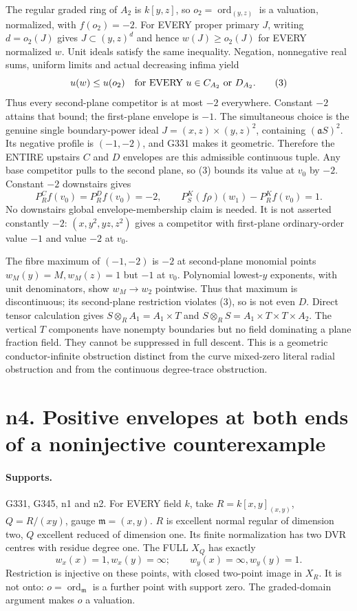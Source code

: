 \documentclass[11pt]{article}
\begin{document}
The regular graded ring of $A_2$ is $k[y,z]$, so $o_2=\operatorname{ord}_{(y,z)}$ is a valuation, normalized, with $f(o_2)=-2$. For EVERY proper primary $J$, writing $d=o_2(J)$ gives $J\subset(y,z)^d$ and hence $w(J)\ge o_2(J)$ for EVERY normalized $w$. Unit ideals satisfy the same inequality. Negation, nonnegative real sums, uniform limits and actual decreasing infima yield
\[
 u(w)\le u(o_2)\quad\hbox{for EVERY }u\in C_{A_2}\text{ or }D_{A_2}. \tag{3}
\]
Thus every second-plane competitor is at most $-2$ everywhere. Constant $-2$ attains that bound; the first-plane envelope is $-1$. The simultaneous choice is the genuine single boundary-power ideal
$J=(x,z)\times(y,z)^2$, containing $(\mathfrak aS)^2$. Its negative profile is $(-1,-2)$, and G331 makes it geometric. Therefore the ENTIRE upstairs $C$ and $D$ envelopes are this admissible continuous tuple. Any base competitor pulls to the second plane, so (3) bounds its value at $v_0$ by $-2$. Constant $-2$ downstairs gives
\[
 P_R^Cf(v_0)=P_R^Df(v_0)=-2,\qquad
 P_S^K(f\rho)(w_1)-P_R^Kf(v_0)=1. \tag{4}
\]
No downstairs global envelope-membership claim is needed. It is not asserted constantly $-2$: $(x,y^2,yz,z^2)$ gives a competitor with first-plane ordinary-order value $-1$ and value $-2$ at $v_0$.

The fibre maximum of $(-1,-2)$ is $-2$ at second-plane monomial points $w_M(y)=M,w_M(z)=1$ but $-1$ at $v_0$. Polynomial lowest-$y$ exponents, with unit denominators, show $w_M\to w_2$ pointwise. Thus that maximum is discontinuous; its second-plane restriction violates (3), so is not even $D$. Direct tensor calculation gives
$S\otimes_R A_1=A_1\times T$ and $S\otimes_R S=A_1\times T\times T\times A_2$. The vertical $T$ components have nonempty boundaries but no field dominating a plane fraction field. They cannot be suppressed in full descent. This is a geometric conductor-infinite obstruction distinct from the curve mixed-zero literal radial obstruction and from the continuous degree-trace obstruction.


\section{n4. Positive envelopes at both ends of a noninjective counterexample}
\paragraph{Supports.} G331, G345, n1 and n2.
For EVERY field $k$, take $R=k[x,y]_{(x,y)}$, $Q=R/(xy)$, gauge $\mathfrak m=(x,y)$. $R$ is excellent normal regular of dimension two, $Q$ excellent reduced of dimension one. Its finite normalization has two DVR centres with residue degree one. The FULL $X_Q$ has exactly
\[
 w_x(x)=1,w_x(y)=\infty;\qquad w_y(x)=\infty,w_y(y)=1.
\]
Restriction is injective on these points, with closed two-point image in $X_R$. It is not onto: $o=\operatorname{ord}_{\mathfrak m}$ is a further point with support zero. The graded-domain argument makes $o$ a valuation.
\end{document}
